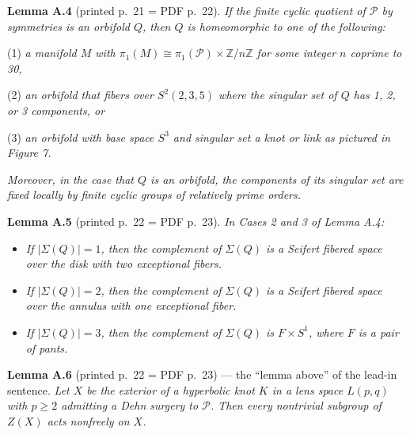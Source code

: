 \documentclass[11pt]{article}
\newcommand{\Ps}{\ensuremath{\mathcal{P}}}   %
\begin{document}
\medskip
\noindent\textbf{Lemma A.4} (printed p.~21 = PDF p.~22). \emph{If the finite cyclic quotient of
$\Ps$ by symmetries is an orbifold $Q$, then $Q$ is homeomorphic to one of the following:}

(1) \emph{a manifold $M$ with $\pi_1(M) \cong \pi_1(\Ps) \times \mathbb{Z}/n\mathbb{Z}$ for some
integer $n$ coprime to 30,}

(2) \emph{an orbifold that fibers over $S^2(2,3,5)$ where the singular set of $Q$ has 1, 2, or 3
components, or}

(3) \emph{an orbifold with base space $S^3$ and singular set a knot or link as pictured in Figure
7.}

\emph{Moreover, in the case that $Q$ is an orbifold, the components of its singular set are fixed
locally by finite cyclic groups of relatively prime orders.}

\medskip
\noindent\textbf{Lemma A.5} (printed p.~22 = PDF p.~23). \emph{In Cases 2 and 3 of Lemma A.4:}

\begin{itemize}
\item \emph{If $|\Sigma(Q)| = 1$, then the complement of $\Sigma(Q)$ is a Seifert fibered space over
the disk with two exceptional fibers.}
\item \emph{If $|\Sigma(Q)| = 2$, then the complement of $\Sigma(Q)$ is a Seifert fibered space over
the annulus with one exceptional fiber.}
\item \emph{If $|\Sigma(Q)| = 3$, then the complement of $\Sigma(Q)$ is $F \times S^1$, where $F$ is
a pair of pants.}
\end{itemize}

\medskip
\noindent\textbf{Lemma A.6} (printed p.~22 = PDF p.~23) --- the ``lemma above'' of the lead-in
sentence. \emph{Let $X$ be the exterior of a hyperbolic knot $K$ in a lens space $L(p,q)$ with
$p \ge 2$ admitting a Dehn surgery to $\Ps$. Then every nontrivial subgroup of $Z(X)$ acts
nonfreely on $X$.}
\end{document}
